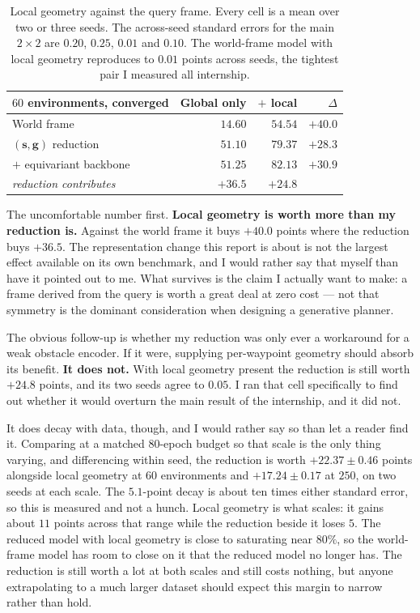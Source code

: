 \documentclass[11pt,a4paper]{article}
\newcommand{\toprule}{\hline}
\newcommand{\midrule}{\hline}
\newcommand{\bottomrule}{\hline}
\newcommand{\svec}{\mathbf{s}}
\newcommand{\gvec}{\mathbf{g}}
\begin{document}
\begin{table}[t]
\centering
\small
\begin{tabular}{lrrr}
\toprule
$60$ environments, converged & Global only & $+$ local & $\Delta$ \\
\midrule
World frame                    & $14.60$ & $54.54$ & $+40.0$ \\
$(\svec,\gvec)$ reduction      & $51.10$ & $79.37$ & $+28.3$ \\
\quad $+$ equivariant backbone & $51.25$ & $\mathbf{82.13}$ & $+30.9$ \\
\midrule
\emph{reduction contributes}   & $+36.5$ & $+24.8$ & \\
\bottomrule
\end{tabular}
\caption{Local geometry against the query frame. Every cell is a mean over two
or three seeds. The across-seed standard errors for the main $2\times2$ are
$0.20$, $0.25$, $0.01$ and $0.10$. The world-frame model with local geometry
reproduces to $0.01$ points across seeds, the tightest pair I measured all
internship.}
\label{tab:localgeom}
\end{table}

The uncomfortable number first. \textbf{Local geometry is worth more than my
reduction is.} Against the world frame it buys $+40.0$ points where the
reduction buys $+36.5$. The representation change this report is about is not
the largest effect available on its own benchmark, and I would rather say that
myself than have it pointed out to me. What survives is the claim I actually
want to make: a frame derived from the query is worth a great deal at zero
cost --- not that symmetry is the dominant consideration when designing a
generative planner.

The obvious follow-up is whether my reduction was only ever a workaround for a
weak obstacle encoder. If it were, supplying per-waypoint geometry should absorb
its benefit. \textbf{It does not.} With local geometry present the reduction is
still worth $+24.8$ points, and its two seeds agree to $0.05$. I ran that cell
specifically to find out whether it
would overturn the main result of the internship, and it did not.

It does decay with data, though, and I would rather say so than let a reader find
it. Comparing at a matched $80$-epoch budget so that scale is the only thing
varying, and differencing within seed, the reduction is worth
$+22.37 \pm 0.46$ points alongside local geometry at $60$ environments and
$+17.24 \pm 0.17$ at $250$, on two seeds at each scale. The $5.1$-point decay is
about ten times either standard error, so this is measured and not a hunch. Local
geometry is what scales: it gains about $11$ points across that range while the
reduction beside it loses $5$. The reduced model with local geometry is close to
saturating near $80\%$, so the world-frame model has room to close on it that the
reduced model no longer has. The reduction is still worth a lot at both scales and
still costs nothing, but anyone extrapolating to a much larger dataset should
expect this margin to narrow rather than hold.
\end{document}
